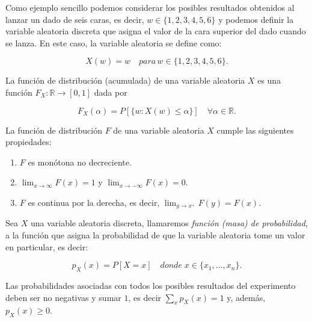 \begin{ejemplo}
    Como ejemplo sencillo podemos considerar los posibles resultados obtenidos al lanzar un dado de seis caras, es decir, $w \in \{1,2,3,4,5,6\}$ y podemos definir la variable aleatoria discreta que asigna el valor de la cara superior del dado cuando se lanza. En este caso, la variable aleatoria se define como:

    \[ X(w) = w \quad para \, w \in \{1,2,3,4,5,6\}. \]\newline
\end{ejemplo}

\begin{definicion}\label{def:funcion-de-distribucion}
    La función de distribución (acumulada) de una variable aleatoria $X$ es una función $F_X: \mathbb{R} \to [0,1]$ dada por

    \[ F_X(\alpha) = P[\{ w:X(w) \le \alpha\}] \quad \forall \alpha \in \mathbb{R}. \]\newline
\end{definicion}

\begin{proposicion}
    La función de distribución $F$ de una variable aleatoria $X$ cumple las siguientes propiedades:

    \begin{enumerate}
        \item $F$ es monótona no decreciente.
        \item $\lim_{x \to \infty} F(x) = 1$ y $\lim_{x \to -\infty} F(x) = 0$.
        \item $F$ es continua por la derecha, es decir, $\lim_{y \to x^+} F(y) = F(x)$.\newline
    \end{enumerate}
\end{proposicion}

\begin{definicion}\label{def:funcion-de-probabilidad}
    Sea $X$ una variable aleatoria discreta, llamaremos \emph{función (masa) de probabilidad}, a la función que asigna la probabilidad de que la variable aleatoria tome un valor en particular, es decir:

    \[ p_X(x) = P[X = x] \quad donde \; x \in \{x_1, \ldots, x_n\}. \]
\end{definicion}

Las probabilidades asociadas con todos los posibles resultados del experimento deben ser no negativas y sumar $1$, es decir $ \sum_x p_X(x) = 1 $ y, además, $p_X(x) \ge 0$.\newline

